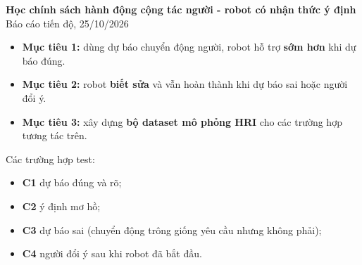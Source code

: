 \documentclass[11pt]{article}
\newcommand{\muc}[1]{\par\smallskip{\large\bfseries #1}\par}
\begin{document}
\begin{center}
{\large\bfseries Học chính sách hành động cộng tác người - robot có nhận thức ý định}\\[2pt]
Báo cáo tiến độ, 25/10/2026
\end{center}

\muc{1. Mục tiêu}
\begin{itemize}
  \item \textbf{Mục tiêu 1:} dùng dự báo chuyển động người, robot hỗ trợ \textbf{sớm hơn} khi dự báo đúng.
  \item \textbf{Mục tiêu 2:} robot \textbf{biết sửa} và vẫn hoàn thành khi dự báo sai hoặc người đổi ý.
  \item \textbf{Mục tiêu 3:} xây dựng \textbf{bộ dataset mô phỏng HRI} cho các trường hợp tương tác trên.
\end{itemize}
Các trường hợp test:
\begin{itemize}
  \item \textbf{C1} dự báo đúng và rõ;
  \item \textbf{C2} ý định mơ hồ;
  \item \textbf{C3} dự báo sai (chuyển động trông giống yêu cầu nhưng không phải);
  \item \textbf{C4} người đổi ý sau khi robot đã bắt đầu.
\end{itemize}
\end{document}
